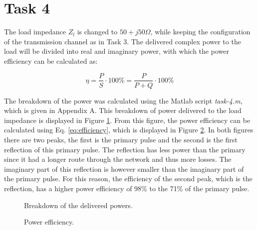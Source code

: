 \documentclass[final]{scrreprt} %
\begin{document}
\section{Task 4}
The load impedance $Z_l$ is changed to $50 + j50 \Omega$, while keeping the configuration of the transmission channel as in Task 3. The delivered complex power to the load will be divided into real and imaginary power, with which the power efficiency can be calculated as:

\begin{equation}
	\eta = \frac{P}{S} \cdot 100\% = \frac{P}{P + Q} \cdot 100\%
	\label{eq:efficiency}
\end{equation}

The breakdown of the power was calculated using the Matlab script \emph{task-4.m}, which is given in Appendix A. This breakdown of power delivered to the load impedance is displayed in Figure \ref{fig:breakdown}. From this figure, the power efficiency can be calculated using Eq. \ref{eq:efficiency}, which is displayed in Figure \ref{fig:efficiency}. In both figures there are two peaks, the first is the primary pulse and the second is the first reflection of this primary pulse. The reflection has less power than the primary since it had a longer route through the network and thus more losses. The imaginary part of this reflection is however smaller than the imaginary part of the primary pulse. For this reason, the efficiency of the second peak, which is the reflection, has a higher power efficiency of 98\% to the 71\% of the primary pulse.

\begin{figure}[H]
	\centering
	\setlength\figureheight{4cm}
    	\setlength{}
	
	\caption{Breakdown of the delivered powers.}
	\label{fig:breakdown}
\end{figure}

\begin{figure}[H]
	\centering
	\setlength\figureheight{4cm}
    	\setlength{}
	
	\caption{Power efficiency.}
	\label{fig:efficiency}
\end{figure}
\end{document}
